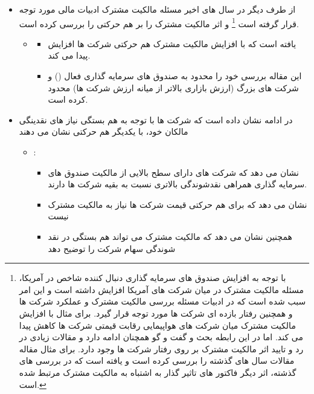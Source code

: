 \documentclass[12pt, a4paper]{article}
\begin{document}
\begin{itemize}
\item 
از طرف دیگر در سال های اخیر مسئله مالکیت مشترک ادبیات مالی مورد توجه قرار گرفته است
\footnote{
	با توجه به افزایش صندوق های سرمایه گذاری  دنبال کننده شاخص در آمریکا، مسئله مالکیت مشترک در میان شرکت های آمریکا افزایش داشته است و این امر سبب شده است که در ادبیات مسئله بررسی مالکیت مشترک و عملکرد شرکت ها و همچنین رفتار بازده ای شرکت ها مورد توجه قرار گیرد. 
	برای مثال 
	با افزایش مالکیت مشترک میان شرکت های هواپیمایی رقابت قیمتی شرکت ها کاهش پیدا می کند.  اما در این رابطه بحث و گفت و گو همچنان ادامه دارد و مقالات زیادی در رد و تایید اثر مالکیت مشترک بر روی رفتار شرکت ها وجود دارد. برای مثال مقاله
	مقالات سال های گذشته را بررسی کرده است و یافته است که در بررسی های گذشته، اثر دیگر فاکتور های تاثیر گذار به اشتباه به مالکیت مشترک مرتبط شده است.
}
 و
اثر مالکیت مشترک را بر هم حرکتی را بررسی کرده است.  

\begin{itemize}
\item {}
\begin{itemize}
\item
یافته است که با افزایش مالکیت مشترک هم حرکتی شرکت ها افزایش پیدا می کند. 
\item
این مقاله بررسی خود را محدود به صندوق های سرمایه گذاری فعال 
() 
و شرکت های بزرگ (ارزش بازاری بالاتر از میانه ارزش شرکت ها) محدود کرده است.
\end{itemize}
\end{itemize}
\item
در ادامه 
نشان داده است که شرکت ها با توجه به هم بستگی نیاز های نقدینگی مالکان خود، با یکدیگر هم حرکتی نشان می دهند
\begin{itemize}
\item {}:
\begin{itemize} 
\item
 نشان می دهد که شرکت های دارای سطح بالایی از مالکیت صندوق های سرمایه گذاری همراهی نقدشوندگی بالاتری نسبت به بقیه شرکت ها دارند.
 \item
 نشان می دهد که برای هم حرکتی قیمت شرکت ها نیاز به مالکیت مشترک نیست
 \item
 همچنین نشان می دهد که مالکیت مشترک می تواند هم بستگی در نقد شوندگی سهام شرکت را توضیح دهد
\end{itemize}


\end{itemize}
\end{itemize}
\end{document}
